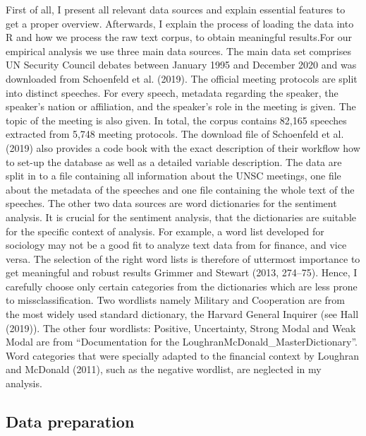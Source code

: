 \documentclass[
]{article}
\begin{document}
First of all, I present all relevant data sources and explain essential
features to get a proper overview. Afterwards, I explain the process of
loading the data into R and how we process the raw text corpus, to
obtain meaningful results.\newline For our empirical analysis we use
three main data sources. The main data set comprises UN Security Council
debates between January 1995 and December 2020 and was downloaded from
Schoenfeld et al. (2019). The official meeting protocols are split into
distinct speeches. For every speech, metadata regarding the speaker, the
speaker's nation or affiliation, and the speaker's role in the meeting
is given. The topic of the meeting is also given. In total, the corpus
contains 82,165 speeches extracted from 5,748 meeting protocols. The
download file of Schoenfeld et al. (2019) also provides a code book with
the exact description of their workflow how to set-up the database as
well as a detailed variable description. \newline The data are split in
to a file containing all information about the UNSC meetings, one file
about the metadata of the speeches and one file containing the whole
text of the speeches. The other two data sources are word dictionaries
for the sentiment analysis. It is crucial for the sentiment analysis,
that the dictionaries are suitable for the specific context of analysis.
For example, a word list developed for sociology may not be a good fit
to analyze text data from for ﬁnance, and vice versa. The selection of
the right word lists is therefore of uttermost importance to get
meaningful and robust results Grimmer and Stewart (2013, 274--75).
Hence, I carefully choose only certain categories from the dictionaries
which are less prone to missclassiﬁcation. Two wordlists namely Military
and Cooperation are from the most widely used standard dictionary, the
Harvard General Inquirer (see Hall (2019)). The other four wordlists:
Positive, Uncertainty, Strong Modal and Weak Modal are from
{``Documentation for the LoughranMcDonald\_MasterDictionary''}. Word
categories that were specially adapted to the ﬁnancial context by
Loughran and McDonald (2011), such as the negative wordlist, are
neglected in my analysis.

\hypertarget{data-preparation}{%
\subsection{Data preparation}\label{data-preparation}}
\end{document}
